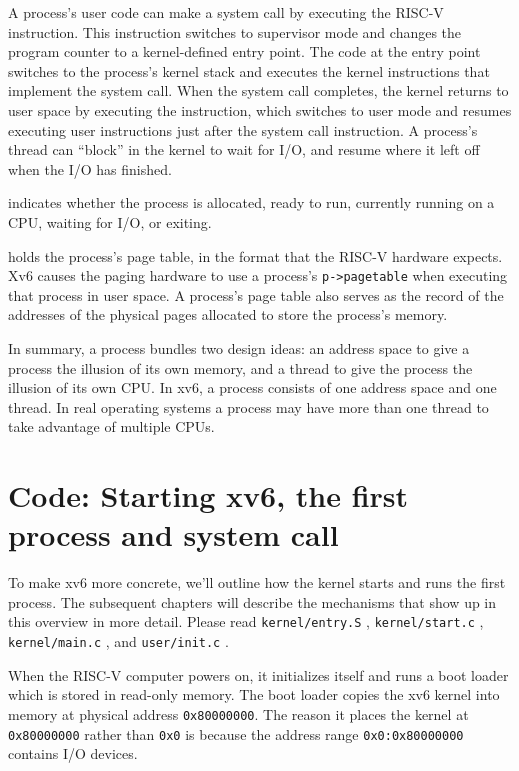 A process's user code
can make a system call by executing the RISC-V 
instruction. This instruction switches to supervisor mode and
changes the program counter to a kernel-defined entry point.  The code
at the entry point switches to the process's kernel stack and executes the kernel
instructions that implement the system call.  When the system call
completes, the kernel returns to
user space by executing the  instruction, which switches
to user mode and resumes executing user instructions
just after the system call instruction.  A process's thread can
``block'' in the kernel to wait for I/O, and resume where it left off
when the I/O has finished.

indicates whether the process is allocated, ready
to run, currently running on a CPU, waiting for I/O, or exiting.

holds the process's page table, in the format
that the RISC-V hardware expects.
Xv6 causes the paging hardware to use a process's
\lstinline{p->pagetable}
when executing that process in user space.
A process's page table also serves as the record of the
addresses of the physical pages allocated to store the process's
memory.

In summary, a process bundles two design ideas: an address space to
give a process the illusion of its own memory, and a thread to give
the process the illusion of its own CPU.  In xv6, a process consists
of one address space and one thread.  In real operating systems a
process may have more than one thread to take advantage of multiple CPUs.

\section{Code: Starting xv6, the first process and system call}
To make xv6 more concrete, we'll outline how the kernel starts and
runs the first process. The subsequent chapters will describe the
mechanisms that show up in this overview in more detail.
Please read \lstinline{kernel/entry.S} , \lstinline{kernel/start.c} ,
\lstinline{kernel/main.c} , and \lstinline{user/init.c} .

When the RISC-V computer powers on, it initializes
itself and runs a boot loader which is stored in read-only
memory.  The boot loader copies the xv6 kernel into memory
at physical address
\texttt{0x80000000}.
The reason it places the kernel at
\texttt{0x80000000}
rather than
\texttt{0x0}
is because the address range
\texttt{0x0:0x80000000}
contains I/O devices.

